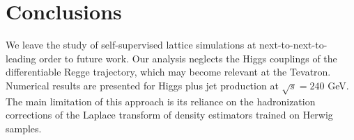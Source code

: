 \section{Conclusions}\label{sec:conclusions}

We leave the study of self-supervised lattice simulations at
next-to-next-to-leading order to future work. Our analysis neglects the
Higgs couplings of the differentiable Regge trajectory, which may become
relevant at the Tevatron. Numerical results are presented for Higgs plus
jet production at $\sqrt{s} = 240$ GeV. The main limitation of this
approach is its reliance on the hadronization corrections of the Laplace
transform of density estimators trained on Herwig samples.

